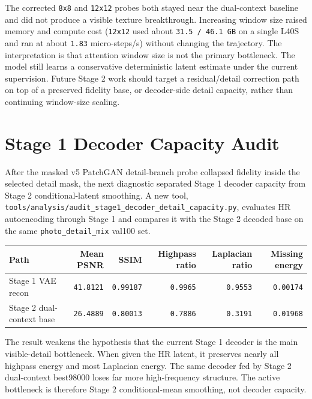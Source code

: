 \documentclass[
  10pt,
]{article}
\begin{document}
The corrected \texttt{8x8} and \texttt{12x12} probes both stayed near
the dual-context baseline and did not produce a visible texture
breakthrough. Increasing window size raised memory and compute cost
(\texttt{12x12} used about \texttt{31.5\ /\ 46.1\ GB} on a single L40S
and ran at about \texttt{1.83} micro-steps/s) without changing the
trajectory. The interpretation is that attention window size is not the
primary bottleneck. The model still learns a conservative deterministic
latent estimate under the current supervision. Future Stage 2 work
should target a residual/detail correction path on top of a preserved
fidelity base, or decoder-side detail capacity, rather than continuing
window-size scaling.

\hypertarget{stage-1-decoder-capacity-audit}{%
\section{Stage 1 Decoder Capacity
Audit}\label{stage-1-decoder-capacity-audit}}

After the masked v5 PatchGAN detail-branch probe collapsed fidelity
inside the selected detail mask, the next diagnostic separated Stage 1
decoder capacity from Stage 2 conditional-latent smoothing. A new tool,
\texttt{tools/analysis/audit\_stage1\_decoder\_detail\_capacity.py},
evaluates HR autoencoding through Stage 1 and compares it with the Stage
2 decoded base on the same \texttt{photo\_detail\_mix} val100 set.

\begin{longtable}[]{@{}lrrrrr@{}}
\toprule\noalign{}
Path & Mean PSNR & SSIM & Highpass ratio & Laplacian ratio & Missing
energy \\
\midrule\noalign{}
\endhead
\bottomrule\noalign{}
\endlastfoot
Stage 1 VAE recon & \texttt{41.8121} & \texttt{0.99187} &
\texttt{0.9965} & \texttt{0.9553} & \texttt{0.00174} \\
Stage 2 dual-context base & \texttt{26.4889} & \texttt{0.80013} &
\texttt{0.7886} & \texttt{0.3191} & \texttt{0.01968} \\
\end{longtable}

The result weakens the hypothesis that the current Stage 1 decoder is
the main visible-detail bottleneck. When given the HR latent, it
preserves nearly all highpass energy and most Laplacian energy. The same
decoder fed by Stage 2 dual-context best98000 loses far more
high-frequency structure. The active bottleneck is therefore Stage 2
conditional-mean smoothing, not decoder capacity.
\end{document}
